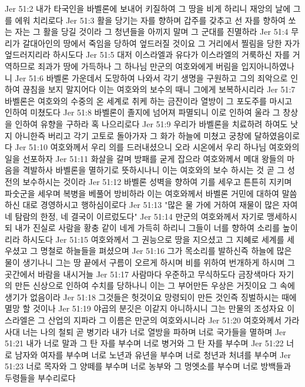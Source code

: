 Jer 51:2  내가 타국인을 바벨론에 보내어 키질하여 그 땅을 비게 하리니 재앙의 날에 그를 에워 치리로다
Jer 51:3  활을 당기는 자를 향하며 갑주를 갖추고 선 자를 향하여 쏘는 자는 그 활을 당길 것이라 그 청년들을 아끼지 말며 그 군대를 진멸하라
Jer 51:4  무리가 갈대아인의 땅에서 죽임을 당하여 엎드러질 것이요 그 거리에서 찔림을 당한 자가 엎드러지리라 하시도다
Jer 51:5  대저 이스라엘과 유다가 이스라엘의 거룩하신 자를 거역하므로 죄과가 땅에 가득하나 그 하나님 만군의 여호와에게 버림을 입지아니하였나니
Jer 51:6  바벨론 가운데서 도망하여 나와서 각기 생명을 구원하고 그의 죄악으로 인하여 끊침을 보지 말지어다 이는 여호와의 보수의 때니 그에게 보복하시리라
Jer 51:7  바벨론은 여호와의 수중의 온 세계로 취케 하는 금잔이라 열방이 그 포도주를 마시고 인하여 미쳤도다
Jer 51:8  바벨론이 졸지에 넘어져 파멸되니 이로 인하여 울라 그 창상을 인하여 유향을 구하라 혹 나으리로다
Jer 51:9  우리가 바벨론을 치료하려 하여도 낫지 아니한즉 버리고 각기 고토로 돌아가자 그 화가 하늘에 미쳤고 궁창에 달하였음이로다
Jer 51:10  여호와께서 우리 의를 드러내셨으니 오라 시온에서 우리 하나님 여호와의 일을 선포하자
Jer 51:11  화살을 갈며 방패를 굳게 잡으라 여호와께서 메대 왕들의 마음을 격발하사 바벨론을 멸하기로 뜻하시나니 이는 여호와의 보수 하시는 것 곧 그 성전의 보수하시는 것이라
Jer 51:12  바벨론 성벽을 향하여 기를 세우고 튼튼히 지키며 파숫군을 세우며 복병을 베풀어 방비하라 이는 여호와께서 바벨론 거민에 대하여 말씀하신 대로 경영하시고 행하심이로다
Jer 51:13  "많은 물 가에 거하여 재물이 많은 자여 네 탐람의 한정, 네 결국이 이르렀도다"
Jer 51:14  만군의 여호와께서 자기로 맹세하시되 내가 진실로 사람을 황충 같이 네게 가득히 하리니 그들이 너를 향하여 소리를 높이리라 하시도다
Jer 51:15  여호와께서 그 권능으로 땅을 지으셨고 그 지혜로 세계를 세우셨고 그 명철로 하늘들을 펴셨으며
Jer 51:16  그가 목소리를 발하신즉 하늘에 많은 물이 생기나니 그는 땅 끝에서 구름이 오르게 하시며 비를 위하여 번개하게 하시며 그 곳간에서 바람을 내시거늘
Jer 51:17  사람마다 우준하고 무식하도다 금장색마다 자기의 만든 신상으로 인하여 수치를 당하나니 이는 그 부어만든 우상은 거짓이요 그 속에 생기가 없음이라
Jer 51:18  그것들은 헛것이요 망령되이 만든 것인즉 징벌하시는 때에 멸망 할 것이나
Jer 51:19  야곱의 분깃은 이같지 아니하시니 그는 만물의 조성자요 이스라엘은 그 산업의 지파라 그 이름은 만군의 여호와시니라
Jer 51:20  여호와께서 가라사대 너는 나의 철퇴 곧 병기라 내가 너로 열방을 파하며 너로 국가들을 멸하며
Jer 51:21  내가 너로 말과 그 탄 자를 부수며 너로 병거와 그 탄 자를 부수며
Jer 51:22  너로 남자와 여자를 부수며 너로 노년과 유년을 부수며 너로 청년과 처녀를 부수며
Jer 51:23  너로 목자와 그 양떼를 부수며 너로 농부와 그 멍엣소를 부수며 너로 방백들과 두령들을 부수리로다
